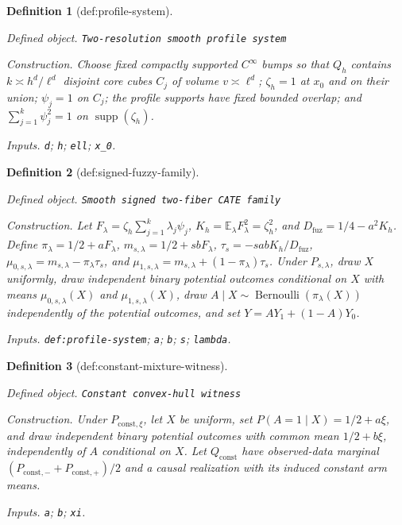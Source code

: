 \documentclass{article}
\newtheorem{definition}{Definition}
\begin{document}
\begin{definition}[def:profile-system]\label{def:profile-system}
\par\smallskip\noindent\emph{Defined object.} \texttt{Two-\allowbreak{}resolution smooth profile system}
\par\smallskip\noindent\emph{Construction.} Choose fixed compactly supported \(C^\infty\) bumps so that \(Q_h\) contains \(k\asymp h^d/\ell^d\) disjoint core cubes \(C_j\) of volume \(v\asymp\ell^d\); \(\zeta_h=1\) at \(x_0\) and on their union; \(\psi_j=1\) on \(C_j\); the profile supports have fixed bounded overlap; and \(\sum_{j=1}^k\psi_j^2=1\) on \(\operatorname{supp}(\zeta_h)\).
\par\smallskip\noindent\emph{Inputs.} \texttt{d}; \texttt{h}; \texttt{ell}; \texttt{x\_\allowbreak{}0}.
\end{definition}

\begin{definition}[def:signed-fuzzy-family]\label{def:signed-fuzzy-family}
\par\smallskip\noindent\emph{Defined object.} \texttt{Smooth signed two-\allowbreak{}fiber CATE family}
\par\smallskip\noindent\emph{Construction.} Let \(F_\lambda=\zeta_h\sum_{j=1}^k\lambda_j\psi_j\), \(K_h=\mathbb E_\lambda F_\lambda^2=\zeta_h^2\), and \(D_{\mathrm{fuz}}=1/4-a^2K_h\). Define \(\pi_\lambda=1/2+aF_\lambda\), \(m_{s,\lambda}=1/2+sbF_\lambda\), \(\tau_s=-sabK_h/D_{\mathrm{fuz}}\), \(\mu_{0,s,\lambda}=m_{s,\lambda}-\pi_\lambda\tau_s\), and \(\mu_{1,s,\lambda}=m_{s,\lambda}+(1-\pi_\lambda)\tau_s\). Under \(P_{s,\lambda}\), draw \(X\) uniformly, draw independent binary potential outcomes conditional on \(X\) with means \(\mu_{0,s,\lambda}(X)\) and \(\mu_{1,s,\lambda}(X)\), draw \(A\mid X\sim\operatorname{Bernoulli}(\pi_\lambda(X))\) independently of the potential outcomes, and set \(Y=AY_1+(1-A)Y_0\).
\par\smallskip\noindent\emph{Inputs.} \texttt{def:\allowbreak{}profile-\allowbreak{}system}; \texttt{a}; \texttt{b}; \texttt{s}; \texttt{lambda}.
\end{definition}

\begin{definition}[def:constant-mixture-witness]\label{def:constant-mixture-witness}
\par\smallskip\noindent\emph{Defined object.} \texttt{Constant convex-\allowbreak{}hull witness}
\par\smallskip\noindent\emph{Construction.} Under \(P_{\mathrm{const},\xi}\), let \(X\) be uniform, set \(P(A=1\mid X)=1/2+a\xi\), and draw independent binary potential outcomes with common mean \(1/2+b\xi\), independently of \(A\) conditional on \(X\). Let \(Q_{\mathrm{const}}\) have observed-data marginal \((P_{\mathrm{const},-}+P_{\mathrm{const},+})/2\) and a causal realization with its induced constant arm means.
\par\smallskip\noindent\emph{Inputs.} \texttt{a}; \texttt{b}; \texttt{xi}.
\end{definition}
\end{document}
